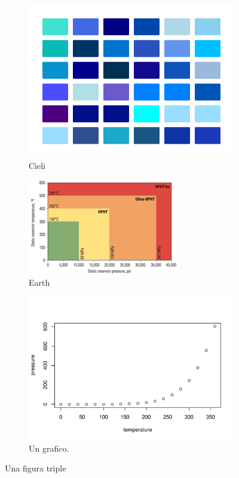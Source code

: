\documentclass[
]{article}
\begin{document}
\begin{figure}
\centering
\begin{subfigure}{0.3\textwidth}

\includegraphics[width=0.8\linewidth]{images/blues} 
\caption{Cieli}
\label{sub:cieli1}
\end{subfigure}
\begin{subfigure}{0.3\textwidth}

\includegraphics[width=0.8\linewidth]{images/insidearth} 
\caption{Earth}
\label{sub:earth}
\end{subfigure}
\begin{subfigure}{0.3\textwidth}

\includegraphics[width=0.8\linewidth]{latex_files/figure-latex/unnamed-chunk-3-1} 
\caption{Un grafico.}
\label{sub:grafico}
\end{subfigure}
\caption{Una figura triple}
\end{figure}
\end{document}
